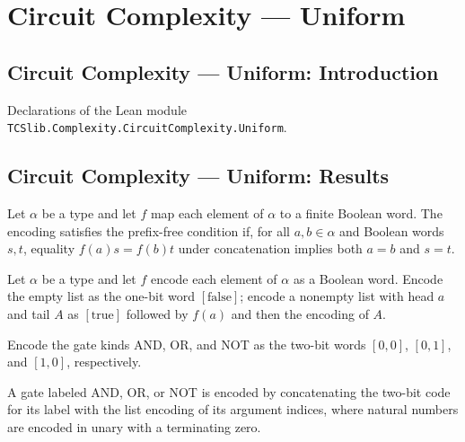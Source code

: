 \section{Circuit Complexity --- Uniform}
\subsection*{Circuit Complexity --- Uniform: Introduction}

Declarations of the Lean module \texttt{TCSlib.Complexity.CircuitComplexity.Uniform}.

\subsection*{Circuit Complexity --- Uniform: Results}

\begin{definition}
\label{BoolCircuit.PrefixFree}
\leanok
Let $\alpha$ be a type and let $f$ map each element of $\alpha$ to a finite Boolean
word. The encoding satisfies the prefix-free condition if, for all $a,b\in\alpha$ and
Boolean words $s,t$, equality $f(a)s=f(b)t$ under concatenation implies both $a=b$ and
$s=t$.
\end{definition}

\begin{definition}
\label{BoolCircuit.encodeList}
\leanok
Let $\alpha$ be a type and let $f$ encode each element of $\alpha$ as a Boolean word.
Encode the empty list as the one-bit word $[\mathrm{false}]$; encode a nonempty list
with head $a$ and tail $A$ as $[\mathrm{true}]$ followed by $f(a)$ and then the encoding
of $A$.
\end{definition}

\begin{definition}
\label{BoolCircuit.GateKind.encode}
\leanok
{}
Encode the gate kinds AND, OR, and NOT as the two-bit words $[0,0]$, $[0,1]$, and
$[1,0]$, respectively.
\end{definition}

\begin{definition}
\label{BoolCircuit.DAGGate.encode}
\leanok
{}
A gate labeled AND, OR, or NOT is encoded by concatenating the two-bit code for its
label with the list encoding of its argument indices, where natural numbers are encoded
in unary with a terminating zero.
\end{definition}

